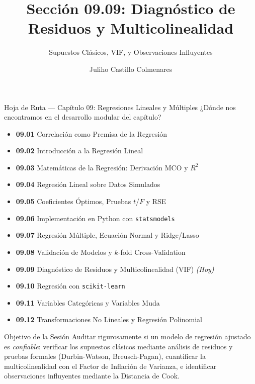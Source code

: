 \documentclass[10pt, aspectratio=169]{beamer}
\title[Diagnóstico de Regresión]{Sección 09.09: Diagnóstico de Residuos y Multicolinealidad}
\subtitle{Supuestos Clásicos, VIF, y Observaciones Influyentes}
\author[J. Castillo Colmenares]{Juliho Castillo Colmenares}
\institute{Tecnológico de Monterrey}
\date{\vspace{-1.2cm}}
\begin{document}
\begin{frame}[plain]
  \vspace{-0.8cm}
  \titlepage
\end{frame}

\begin{frame}{Hoja de Ruta --- Capítulo 09: Regresiones Lineales y Múltiples}
  \scriptsize
  ¿Dónde nos encontramos en el desarrollo modular del capítulo?
  \begin{itemize}\itemsep=0.02em
    \item \textbf{09.01} Correlación como Premisa de la Regresión
    \item \textbf{09.02} Introducción a la Regresión Lineal
    \item \textbf{09.03} Matemáticas de la Regresión: Derivación MCO y $R^2$
    \item \textbf{09.04} Regresión Lineal sobre Datos Simulados
    \item \textbf{09.05} Coeficientes Óptimos, Pruebas $t$/$F$ y RSE
    \item \textbf{09.06} Implementación en Python con \texttt{statsmodels}
    \item \textbf{09.07} Regresión Múltiple, Ecuación Normal y Ridge/Lasso
    \item \textbf{09.08} Validación de Modelos y $k$-fold Cross-Validation
    \item \textbf{09.09} Diagnóstico de Residuos y Multicolinealidad (VIF) \emph{(Hoy)}
    \item \textbf{09.10} Regresión con \texttt{scikit-learn}
    \item \textbf{09.11} Variables Categóricas y Variables Muda
    \item \textbf{09.12} Transformaciones No Lineales y Regresión Polinomial
  \end{itemize}
  \pause
  \vspace{-0.05cm}
  \begin{block}{Objetivo de la Sesión}
    Auditar rigurosamente si un modelo de regresión ajustado es \emph{confiable}: verificar los supuestos clásicos mediante análisis de residuos y pruebas formales (Durbin-Watson, Breusch-Pagan), cuantificar la multicolinealidad con el Factor de Inflación de Varianza, e identificar observaciones influyentes mediante la Distancia de Cook.
  \end{block}
\end{frame}
\end{document}
